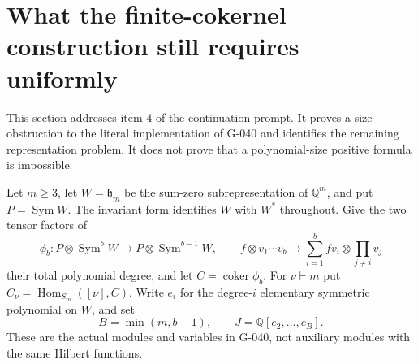 \section{What the finite-cokernel construction still requires uniformly}
\label{sec:uniform-positive-gate}

This section addresses item 4 of the continuation prompt.  It proves a
size obstruction to the literal implementation of G-040 and identifies
the remaining representation problem.  It does not prove that a
polynomial-size positive formula is impossible.

Let $m\ge3$, let $W=\mathfrak h_m$ be the sum-zero subrepresentation
of $\mathbb Q^m$, and put $P=\operatorname{Sym}W$.  The invariant
form identifies $W$ with $W^*$ throughout.  Give the two tensor
factors of
\[
 \phi_b:P\otimes\operatorname{Sym}^bW
       \longrightarrow P\otimes\operatorname{Sym}^{b-1}W,
 \qquad
 f\otimes v_1\cdots v_b\longmapsto
 \sum_{i=1}^b fv_i\otimes\prod_{j\ne i}v_j
 \tag{PNEW-G1}
\]
their total polynomial degree, and let $C=\operatorname{coker}\phi_b$.
For $\nu\vdash m$ put $C_\nu=\operatorname{Hom}_{S_m}([\nu],C)$.
Write $e_i$ for the degree-$i$ elementary symmetric polynomial
on $W$, and set
\[
 B=\min(m,b-1),\qquad J=\mathbb Q[e_2,\ldots,e_B].
 \tag{PNEW-G2}
\]
These are the actual modules and variables in G-040, not auxiliary
modules with the same Hilbert functions.

